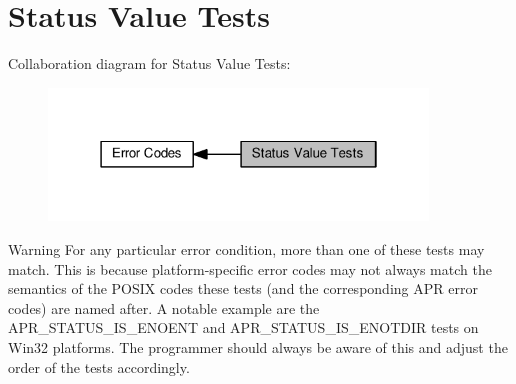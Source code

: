 \hypertarget{group__APU__STATUS__IS}{}\section{Status Value Tests}
\label{group__APU__STATUS__IS}
Collaboration diagram for Status Value Tests\+:
\nopagebreak
\begin{figure}[H]
\begin{center}
\leavevmode
\includegraphics[width=286pt]{group__APU__STATUS__IS}
\end{center}
\end{figure}
\begin{DoxyWarning}{Warning}
For any particular error condition, more than one of these tests may match. This is because platform-\/specific error codes may not always match the semantics of the P\+O\+S\+IX codes these tests (and the corresponding A\+PR error codes) are named after. A notable example are the A\+P\+R\+\_\+\+S\+T\+A\+T\+U\+S\+\_\+\+I\+S\+\_\+\+E\+N\+O\+E\+NT and A\+P\+R\+\_\+\+S\+T\+A\+T\+U\+S\+\_\+\+I\+S\+\_\+\+E\+N\+O\+T\+D\+IR tests on Win32 platforms. The programmer should always be aware of this and adjust the order of the tests accordingly. 
\end{DoxyWarning}
